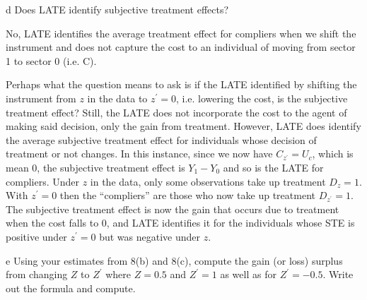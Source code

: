 \documentclass{article}
\begin{document}
\begin{problem}{d}
Does LATE identify subjective treatment effects?
\end{problem}
\begin{solution}
No, LATE identifies the average treatment effect for compliers when we shift the instrument and does not capture the cost to an individual of moving from sector 1 to sector 0 (i.e. C).

Perhaps what the question means to ask is if the LATE identified by shifting the instrument from $z$ in the data to $z^\prime=0$, i.e. lowering the cost, is the subjective treatment effect? Still, the LATE does not incorporate the cost to the agent of making said decision, only the gain from treatment. However, LATE does identify the average subjective treatment effect for individuals whose decision of treatment or not changes. In this instance, since we now have $C_{z^\prime}=U_c$, which is mean 0, the subjective treatment effect is $Y_1-Y_0$ and so is the LATE for compliers. Under $z$ in the data, only some observations take up treatment $D_z=1$. With $z^\prime=0$ then the ``compliers'' are those who now take up treatment $D_{z^\prime}=1$. The subjective treatment effect is now the gain that occurs due to treatment when the cost falls to 0, and LATE identifies it for the individuals whose STE is positive under $z^\prime=0$ but was negative under $z$.
\end{solution}

\begin{problem}{e}
Using your estimates from 8(b) and 8(c), compute the gain (or loss) surplus from changing $Z$ to $Z^{\prime}$ where $Z=0.5$ and $Z^{\prime}=1$ as well as for $Z^{\prime}=-0.5$. Write out the formula and compute.
\end{problem}
\begin{solution}

\end{solution}
\end{document}
